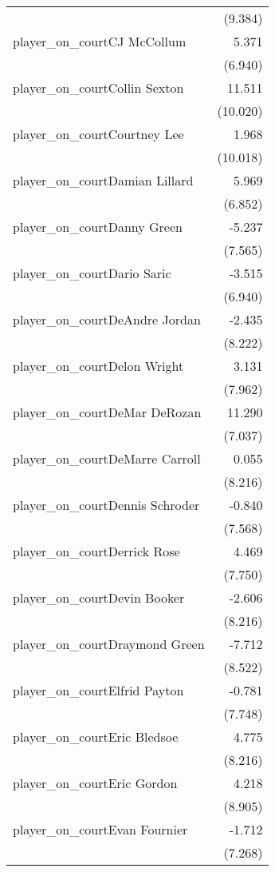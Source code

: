 \documentclass[
  landscape]{article}
\begin{document}
\begin{table}[!htbp]
\begin{tabular}{@{\extracolsep{5pt}}lD{.}{.}{-3} }
  & (9.384) \\ 
  player\_on\_courtCJ McCollum & 5.371 \\ 
  & (6.940) \\ 
  player\_on\_courtCollin Sexton & 11.511 \\ 
  & (10.020) \\ 
  player\_on\_courtCourtney Lee & 1.968 \\ 
  & (10.018) \\ 
  player\_on\_courtDamian Lillard & 5.969 \\ 
  & (6.852) \\ 
  player\_on\_courtDanny Green & -5.237 \\ 
  & (7.565) \\ 
  player\_on\_courtDario Saric & -3.515 \\ 
  & (6.940) \\ 
  player\_on\_courtDeAndre Jordan & -2.435 \\ 
  & (8.222) \\ 
  player\_on\_courtDelon Wright & 3.131 \\ 
  & (7.962) \\ 
  player\_on\_courtDeMar DeRozan & 11.290 \\ 
  & (7.037) \\ 
  player\_on\_courtDeMarre Carroll & 0.055 \\ 
  & (8.216) \\ 
  player\_on\_courtDennis Schroder & -0.840 \\ 
  & (7.568) \\ 
  player\_on\_courtDerrick Rose & 4.469 \\ 
  & (7.750) \\ 
  player\_on\_courtDevin Booker & -2.606 \\ 
  & (8.216) \\ 
  player\_on\_courtDraymond Green & -7.712 \\ 
  & (8.522) \\ 
  player\_on\_courtElfrid Payton & -0.781 \\ 
  & (7.748) \\ 
  player\_on\_courtEric Bledsoe & 4.775 \\ 
  & (8.216) \\ 
  player\_on\_courtEric Gordon & 4.218 \\ 
  & (8.905) \\ 
  player\_on\_courtEvan Fournier & -1.712 \\ 
  & (7.268) \\ 

\end{tabular}
\end{table}
\end{document}
